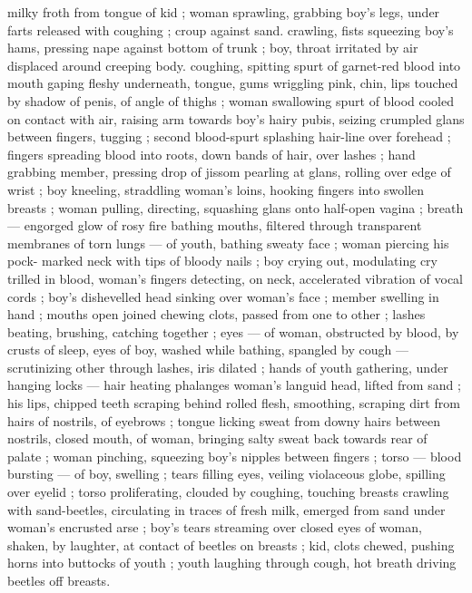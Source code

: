 milky froth from tongue of kid ; woman sprawling, grabbing boy's 
legs, under farts released with coughing ; croup against sand. 
crawling, fists squeezing boy's hams, pressing nape against bottom 
of trunk ; boy, throat irritated by air displaced around creeping body. 
coughing, spitting spurt of garnet-red blood into mouth gaping 
fleshy underneath, tongue, gums wriggling pink, chin, lips touched 
by shadow of penis, of angle of thighs ; woman swallowing spurt of 
blood cooled on contact with air, raising arm towards boy's hairy 
pubis, seizing crumpled glans between fingers, tugging ; second 
blood-spurt splashing hair-line over forehead ; fingers spreading 
blood into roots, down bands of hair, over lashes ; hand grabbing 
member, pressing {\col} drop of jissom pearling at glans, rolling over 
edge of wrist ; boy kneeling, straddling woman's loins, hooking 
fingers into swollen breasts ; woman pulling, directing, squashing 
glans onto half-open vagina ; breath --- engorged glow of rosy fire 
bathing mouths, filtered through transparent membranes of torn 
lungs --- of youth, bathing sweaty face ; woman piercing his pock- 
marked neck with tips of bloody nails ; boy crying out, modulating 
cry trilled in blood, woman's fingers detecting, on neck, accelerated 
vibration of vocal cords ; boy's dishevelled head sinking over 
woman's face ; member swelling in hand ; mouths open joined 
chewing clots, passed from one to other ; lashes beating, brushing, 
catching together ; eyes --- of woman, obstructed by blood, by 
crusts of sleep, eyes of boy, washed while bathing, spangled by 
cough --- scrutinizing other through lashes, iris dilated ; hands of 
youth gathering, under hanging locks --- hair heating phalanges {\dashcom}
woman's languid head, lifted from sand ; his lips, chipped teeth 
scraping behind rolled flesh, smoothing, scraping dirt from hairs of 
nostrils, of eyebrows ; tongue licking sweat from downy hairs 
between nostrils, closed mouth, of woman, bringing salty sweat back 
towards rear of palate ; woman pinching, squeezing boy's nipples 
between fingers ; torso --- blood bursting --- of boy, swelling ; tears 
filling eyes, veiling violaceous globe, spilling over eyelid ; torso 
proliferating, clouded by coughing, touching breasts crawling with 
sand-beetles, circulating in traces of fresh milk, emerged from sand 
under woman's encrusted arse ; boy's tears streaming over closed 
eyes of woman, shaken, by laughter, at contact of beetles on breasts 
; kid, clots chewed, pushing horns into buttocks of youth ; youth 
laughing through cough, hot breath driving beetles off breasts. 
